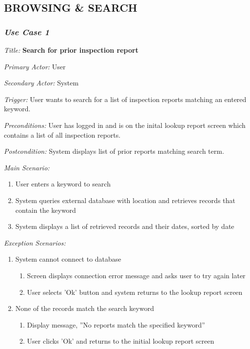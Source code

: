 \documentclass[twoside,letterpaper]{article}
\begin{document}
\subsection[BROWSING \& SEARCH]{\rmfamily\bfseries\color{black}
BROWSING \& SEARCH}

\subsubsection{\textit{Use Case 1}}

\textit{Title: }{\bfseries\color{black} Search for prior inspection report}

{\color{black} \textit{Primary Actor:} User}

{\color{black} \textit{Secondary Actor:} System}

{\color{black} \textit{Trigger:} User wants to search for a list of inspection reports matching an entered keyword.}

{\color{black} \textit{Preconditions:} User has logged in and is on the inital lookup report screen which contains a list of all inspection reports.}

{\color{black} \textit{Postcondition:} System displays list of prior reports matching search term.}
\newline

{\color{black} \textit{Main Scenario:}}
\begin{enumerate}
\item User enters a keyword to search
\item System queries external database with location and retrieves records that contain the keyword
\item System displays a list of retrieved records and their dates, sorted by date
\end{enumerate}

{\color{black} \textit{Exception Scenarios:}}
\begin{enumerate}
\item System cannot connect to database
\begin{enumerate}
\item Screen displays connection error message and asks user to try again later
\item User selects 'Ok' button and system returns to the lookup report screen
\end{enumerate}

\item None of the records match the search keyword
\begin{enumerate}
\item Display message, ''No reports match the specified keyword''
\item User clicks 'Ok' and returns to the initial lookup report screen
\end{enumerate}
\end{enumerate}
\end{document}
